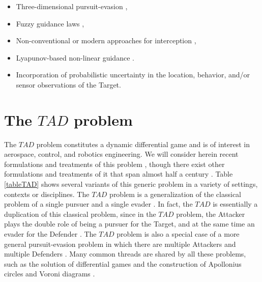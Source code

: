 \begin{itemize}
	\item Three-dimensional pursuit-evasion \cite{adler1956missile,shinar1980three,lin2010development,gutman20103d},
	\item Fuzzy guidance laws \cite{pham2012fuzzy,li2014fuzzy},
	\item Non-conventional or modern approaches for interception \cite{nesline2012new,shinar2009meeting},
	\item Lyapunov-based non-linear guidance \cite{lechevin2004lyapunov}.
	\item Incorporation of probabilistic uncertainty in the location, behavior, and/or sensor observations of the Target.
	
\end{itemize}



\section{The $ TAD $ problem}  \label{TADsection}

The $TAD$ problem constitutes a dynamic differential game \cite{ho1965differential,isaacs1954differential,meier1969new,hsueh2007differential,yi2010improved,bressan2010noncooperative,perelman2011cooperative,battistini2014differential,yavin2014pursuit} and is of interest in aerospace, control, and robotics engineering. We will consider herein recent formulations and treatments of this problem \cite{pachter2014active,garcia2015active,garcia2015escape,garcia2014cooperative,garcia2015cooperative,garcia2015cooperative2}, though there exist other formulations and treatments of it that span almost half a century \cite{boyell1976defending,shneydor1977comments,rusnak2005lady,de2010analysis,rusnak2011guidance,fuch2011encouraging,scott2013pursuit,rubinsky2013three,oyler2014pursuit}.
Table \ref{tableTAD} shows several variants of this generic problem in a variety of settings, contexts or disciplines. The $TAD$ problem is a generalization of the classical problem of a single pursuer and a single evader \cite{anderson1978model,miller1994co,cliff1995co,pekalski2004short,zarchan2002tactical}. In fact, the $TAD$ is essentially a duplication of this classical problem, since in the $TAD$ problem, the Attacker plays the double role of being a pursuer for the Target, and at the same time an evader for the Defender \cite{rusnak2008guidance}.
The $TAD$ problem is also a special case of a more general pursuit-evasion problem in which there are multiple Attackers and multiple Defenders  \cite{hagedorn1976differential,kim2001multiagent,fuchs2010cooperative,pan2012pursuit,ragesh2014analysis}. Many common threads are shared by all these problems, such as the solution of differential games \cite{ho1965differential,isaacs1954differential,meier1969new,hsueh2007differential,yi2010improved,bressan2010noncooperative,perelman2011cooperative,battistini2014differential,yavin2014pursuit} and the construction of Apollonius circles \cite{ayoub2003proving,ayoub2006circle,partensky2008circle,fulton2015conflict} and Voroni diagrams \cite{gowda1983dynamic,aurenhammer1991voronoi,cheung2007pursuit,gavrilova2008generalized,majdandzic2008computation,bakolas2010optimal,bakolas2010zermelo,bakolas2011optimal}.


